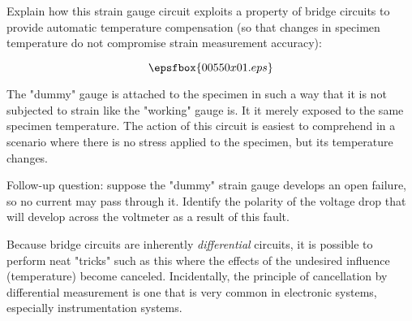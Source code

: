 

Explain how this strain gauge circuit exploits a property of bridge circuits to provide automatic temperature compensation (so that changes in specimen temperature do not compromise strain measurement accuracy):

$$\epsfbox{00550x01.eps}$$







The "dummy" gauge is attached to the specimen in such a way that it is not subjected to strain like the "working" gauge is.  It it merely exposed to the same specimen temperature.  The action of this circuit is easiest to comprehend in a scenario where there is no stress applied to the specimen, but its temperature changes.

\vskip 10pt

Follow-up question: suppose the "dummy" strain gauge develops an open failure, so no current may pass through it.  Identify the polarity of the voltage drop that will develop across the voltmeter as a result of this fault.







Because bridge circuits are inherently {\it differential} circuits, it is possible to perform neat "tricks" such as this where the effects of the undesired influence (temperature) become canceled.  Incidentally, the principle of cancellation by differential measurement is one that is very common in electronic systems, especially instrumentation systems.




